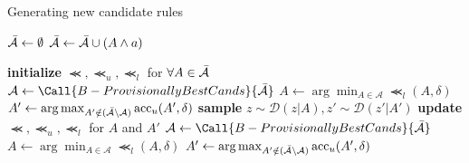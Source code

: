 \documentclass[aspectratio=169]{slide-ja}
\begin{document}
\begin{frame}
  \begin{algorithm}[H]
    \caption{Generating new candidate rules}
    \begin{algorithmic}[1]
      \State$\bar{\mathcal{A}}\gets\emptyset$
      \State$\bar{\mathcal{A}}\gets\bar{\mathcal{A}}\cup(A\wedge a)$
      \EndFor%
      \EndFor%
      \State\Return{$\cands$}
      \EndFunction%
    \end{algorithmic}
  \end{algorithm}
\end{frame}

\begin{frame}
  \begin{algorithm}[H]
    \small
    \caption{%
      Searching rules with highest accuracy (KL-LUCB~\cite{kaufmann2013information})
    }
    \begin{algorithmic}[1]
      \State\textbf{initialize} $\Prec,\Prec_{u},\Prec_{l}$ for $\forall A\in\bar{\mathcal{A}}$
      \State$\mathcal{A}\gets\Call{B-ProvisionallyBestCands}{\cands}$
      \State$A\gets\arg\min_{A\in\mathcal{A}}\Prec_{l}(A,\delta)$
      \State$A'\gets\arg\max_{A'\notin(\bar{\mathcal{A}}\setminus\mathcal{A})}\operatorname{acc}_{u}(A',\delta)$
      \State\textbf{sample} $z\sim\mathcal{D}(z|A),z'\sim\mathcal{D}(z'|A')$
      \State\textbf{update} $\Prec,\Prec_{u},\Prec_{l}$ for $A$ and $A'$
      \State$\mathcal{A}\gets\Call{B-ProvisionallyBestCands}{\cands}$
      \State$A\gets\arg\min_{A\in\mathcal{A}}\Prec_{l}(A,\delta)$
      \State$A'\gets\arg\max_{A'\notin(\bar{\mathcal{A}}\setminus\mathcal{A})}\operatorname{acc}_{u}(A',\delta)$
      \EndWhile%
      \State{}
      \EndFunction%
    \end{algorithmic}
  \end{algorithm}
\end{frame}
\end{document}
